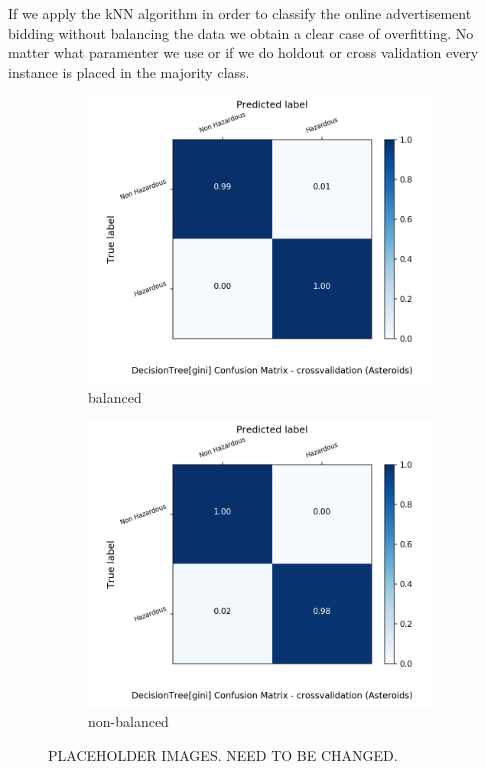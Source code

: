 \documentclass{article}
\begin{document}
If we apply the kNN algorithm in order to classify the online advertisement bidding without balancing the data we obtain a clear case of overfitting.
No matter what paramenter we use or if we do holdout or cross validation every instance is placed in the majority class.


\begin{figure}[H]
	\centering
	\begin{subfigure}{.5\textwidth}
		\centering
		\includegraphics[width=1.1\textwidth]{Plots/asteroids/asteroids_DecisionTree_gini_balance_True_crossvalidation.png}
		\caption{balanced}
	\end{subfigure}%
	\begin{subfigure}{.5\textwidth}
		\centering
		\includegraphics[width=1.1\textwidth]{Plots/asteroids/asteroids_DecisionTree_gini_balance_False_crossvalidation.png}
		\caption{non-balanced}
	\end{subfigure}
	\caption{{\color{red} PLACEHOLDER IMAGES. NEED TO BE CHANGED.}}
\end{figure}
\end{document}
